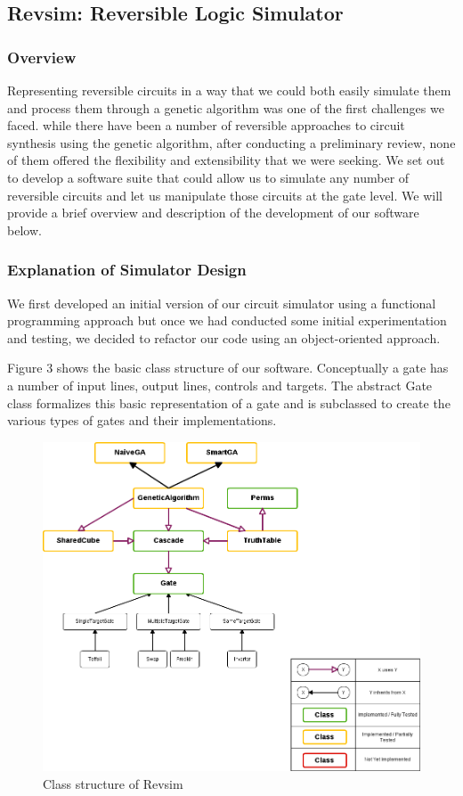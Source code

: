 \subsection{Revsim: Reversible Logic Simulator}
  \subsubsection{Overview}

Representing reversible circuits in a way that we could both easily simulate them and process them through 
a genetic algorithm was one of the first challenges we faced. while there have been a number of reversible approaches 
to circuit synthesis using the genetic algorithm, after conducting a preliminary 
review, none of them offered the flexibility and extensibility that we were seeking. We set out to develop a 
software suite that could allow us to simulate any number of reversible circuits and let us manipulate those 
circuits at the gate level. We will provide a brief overview and description of the development of our software below.

  \subsubsection{Explanation of Simulator Design}

We first developed an initial version of our circuit simulator using a functional programming approach but once we had conducted some initial 
experimentation and testing, we decided to refactor our code using an object-oriented approach.

Figure 3 shows the basic class structure of our software. Conceptually a gate has a number of input lines, output lines, 
controls and targets. The abstract Gate class formalizes this basic representation of a gate and is subclassed to create 
the various types of gates and their implementations.

\begin{figure}[ht!]
\centering
\includegraphics[width=120mm]{diagrams/architecture.png}
\caption{Class structure of Revsim}
\end{figure}

